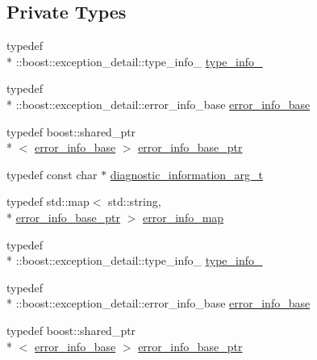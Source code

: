 \subsection*{Private Types}
\begin{DoxyCompactItemize}
\item 
typedef \\*
\-::boost\-::exception\-\_\-detail\-::type\-\_\-info\-\_\- \hyperlink{classecto_1_1except_1_1error__info__container__impl_abe4f51bf533842a5e0b81f3e43ae6267}{type\-\_\-info\-\_\-}
\item 
typedef \\*
\-::boost\-::exception\-\_\-detail\-::error\-\_\-info\-\_\-base \hyperlink{classecto_1_1except_1_1error__info__container__impl_a90c2628bf7c5628003cd24fd369a77da}{error\-\_\-info\-\_\-base}
\item 
typedef boost\-::shared\-\_\-ptr\\*
$<$ \hyperlink{classecto_1_1except_1_1error__info__container__impl_a90c2628bf7c5628003cd24fd369a77da}{error\-\_\-info\-\_\-base} $>$ \hyperlink{classecto_1_1except_1_1error__info__container__impl_a9fbca0758380cb123f790aee77d1d4d8}{error\-\_\-info\-\_\-base\-\_\-ptr}
\item 
typedef const char $\ast$ \hyperlink{classecto_1_1except_1_1error__info__container__impl_a16f5ebd1abcacd60ddbd919ea166958e}{diagnostic\-\_\-information\-\_\-arg\-\_\-t}
\item 
typedef std\-::map$<$ std\-::string, \\*
\hyperlink{classecto_1_1except_1_1error__info__container__impl_a9fbca0758380cb123f790aee77d1d4d8}{error\-\_\-info\-\_\-base\-\_\-ptr} $>$ \hyperlink{classecto_1_1except_1_1error__info__container__impl_a20b3846bc393224fe282eb64a40ee83d}{error\-\_\-info\-\_\-map}
\item 
typedef \\*
\-::boost\-::exception\-\_\-detail\-::type\-\_\-info\-\_\- \hyperlink{classecto_1_1except_1_1error__info__container__impl_abe4f51bf533842a5e0b81f3e43ae6267}{type\-\_\-info\-\_\-}
\item 
typedef \\*
\-::boost\-::exception\-\_\-detail\-::error\-\_\-info\-\_\-base \hyperlink{classecto_1_1except_1_1error__info__container__impl_a90c2628bf7c5628003cd24fd369a77da}{error\-\_\-info\-\_\-base}
\item 
typedef boost\-::shared\-\_\-ptr\\*
$<$ \hyperlink{classecto_1_1except_1_1error__info__container__impl_a90c2628bf7c5628003cd24fd369a77da}{error\-\_\-info\-\_\-base} $>$ \hyperlink{classecto_1_1except_1_1error__info__container__impl_a9fbca0758380cb123f790aee77d1d4d8}{error\-\_\-info\-\_\-base\-\_\-ptr}

\end{DoxyCompactItemize}
